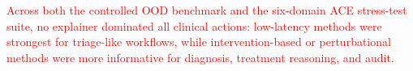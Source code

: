 \documentclass[pdflatex,sn-mathphys-num]{sn-jnl}%
\theoremstyle{thmstyleone}%
\theoremstyle{thmstyletwo}%
\theoremstyle{thmstylethree}%
\begin{document}
{\textcolor{red}{ Across both the controlled OOD benchmark and the six-domain ACE stress-test suite, no explainer dominated all clinical actions: low-latency methods were strongest for triage-like workflows, while intervention-based or perturbational methods were more informative for diagnosis, treatment reasoning, and audit.}




% 
% 
% 
}
\end{document}

